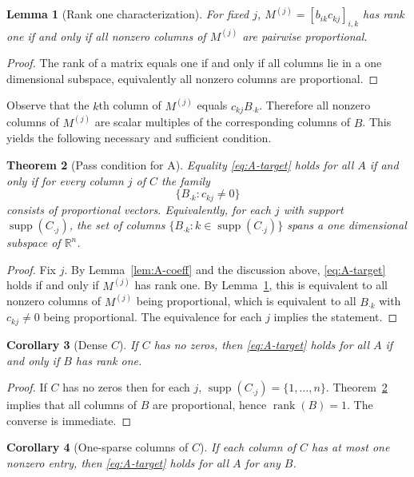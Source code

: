 \documentclass[11pt,a4paper]{article}
\newtheorem{theorem}{Theorem}[section]
\newtheorem{lemma}[theorem]{Lemma}
\newtheorem{corollary}[theorem]{Corollary}
\theoremstyle{definition}
\newcommand{\R}{\mathbb{R}}
\newcommand{\rank}{\operatorname{rank}}
\newcommand{\supp}{\operatorname{supp}}
\begin{document}
\begin{lemma}[Rank one characterization]\label{lem:rank1}
For fixed $j$, $M^{(j)}=[b_{ik}c_{k j}]_{i,k}$ has rank one if and only if all nonzero columns of $M^{(j)}$ are pairwise proportional.
\end{lemma}

\begin{proof}
The rank of a matrix equals one if and only if all columns lie in a one dimensional subspace, equivalently all nonzero columns are proportional.
\end{proof}

Observe that the $k$th column of $M^{(j)}$ equals $c_{k j} B_{\cdot k}$. Therefore all nonzero columns of $M^{(j)}$ are scalar multiples of the corresponding columns of $B$. This yields the following necessary and sufficient condition.

\begin{theorem}[Pass condition for A]\label{thm:A-pass}
Equality \eqref{eq:A-target} holds for all $A$ if and only if for every column $j$ of $C$ the family
\[
\{B_{\cdot k} : c_{k j}\ne 0\}
\]
consists of proportional vectors. Equivalently, for each $j$ with support $\supp(C_{\cdot j})$, the set of columns $\{B_{\cdot k} : k\in\supp(C_{\cdot j})\}$ spans a one dimensional subspace of $\R^n$.
\end{theorem}

\begin{proof}
Fix $j$. By Lemma~\ref{lem:A-coeff} and the discussion above, \eqref{eq:A-target} holds if and only if $M^{(j)}$ has rank one. By Lemma~\ref{lem:rank1}, this is equivalent to all nonzero columns of $M^{(j)}$ being proportional, which is equivalent to all $B_{\cdot k}$ with $c_{k j}\ne 0$ being proportional. The equivalence for each $j$ implies the statement.
\end{proof}

\begin{corollary}[Dense $C$]\label{cor:A-denseC}
If $C$ has no zeros, then \eqref{eq:A-target} holds for all $A$ if and only if $B$ has rank one.
\end{corollary}

\begin{proof}
If $C$ has no zeros then for each $j$, $\supp(C_{\cdot j})=\{1,\dots,n\}$. Theorem~\ref{thm:A-pass} implies that all columns of $B$ are proportional, hence $\rank(B)=1$. The converse is immediate.
\end{proof}

\begin{corollary}[One-sparse columns of $C$]\label{cor:A-1sparse}
If each column of $C$ has at most one nonzero entry, then \eqref{eq:A-target} holds for all $A$ for any $B$.
\end{corollary}
\end{document}
